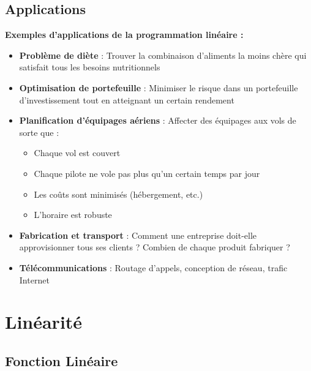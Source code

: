 \documentclass[12pt,a4paper]{article}
\begin{document}
\subsection{Applications}

\begin{exemple}
\textbf{Exemples d'applications de la programmation linéaire :}

\begin{itemize}
    \item \textcolor{titrebleu}{\textbf{Problème de diète}} : Trouver la combinaison d'aliments la moins chère qui satisfait tous les besoins nutritionnels
    
    \item \textcolor{defvert}{\textbf{Optimisation de portefeuille}} : Minimiser le risque dans un portefeuille d'investissement tout en atteignant un certain rendement
    
    \item \textcolor{algoviolet}{\textbf{Planification d'équipages aériens}} : Affecter des équipages aux vols de sorte que :
    \begin{itemize}
        \item Chaque vol est couvert
        \item Chaque pilote ne vole pas plus qu'un certain temps par jour
        \item Les coûts sont minimisés (hébergement, etc.)
        \item L'horaire est robuste
    \end{itemize}
    
    \item \textcolor{exempleorange}{\textbf{Fabrication et transport}} : Comment une entreprise doit-elle approvisionner tous ses clients ? Combien de chaque produit fabriquer ?
    
    \item \textcolor{importantrouge}{\textbf{Télécommunications}} : Routage d'appels, conception de réseau, trafic Internet
\end{itemize}
\end{exemple}

\newpage
\section{Linéarité}

\subsection{Fonction Linéaire}
\end{document}
